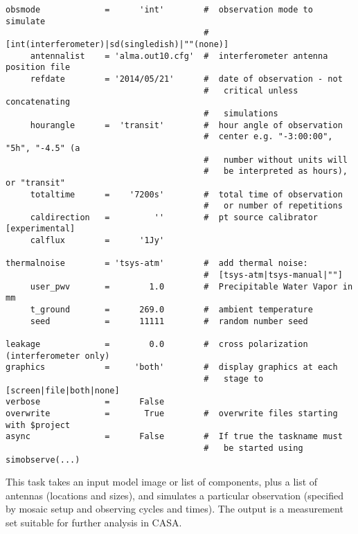 \begin{verbatim}
obsmode             =      'int'        #  observation mode to simulate
                                        #  [int(interferometer)|sd(singledish)|""(none)]
     antennalist    = 'alma.out10.cfg'  #  interferometer antenna position file
     refdate        = '2014/05/21'      #  date of observation - not
                                        #   critical unless concatenating
                                        #   simulations
     hourangle      =  'transit'        #  hour angle of observation
                                        #  center e.g. "-3:00:00", "5h", "-4.5" (a
                                        #   number without units will
                                        #   be interpreted as hours), or "transit"
     totaltime      =    '7200s'        #  total time of observation
                                        #   or number of repetitions
     caldirection   =         ''        #  pt source calibrator [experimental]
     calflux        =      '1Jy'        

thermalnoise        = 'tsys-atm'        #  add thermal noise: 
                                        #  [tsys-atm|tsys-manual|""]
     user_pwv       =        1.0        #  Precipitable Water Vapor in mm
     t_ground       =      269.0        #  ambient temperature
     seed           =      11111        #  random number seed

leakage             =        0.0        #  cross polarization (interferometer only)
graphics            =     'both'        #  display graphics at each
                                        #   stage to [screen|file|both|none]
verbose             =      False        
overwrite           =       True        #  overwrite files starting with $project
async               =      False        #  If true the taskname must
                                        #   be started using simobserve(...)
\end{verbatim}
\normalsize

This task takes an input model image or list of components, plus a
list of antennas (locations and sizes), and simulates a particular
observation (specified by mosaic setup and observing cycles and
times).  The output is a measurement set suitable for further analysis in CASA.

